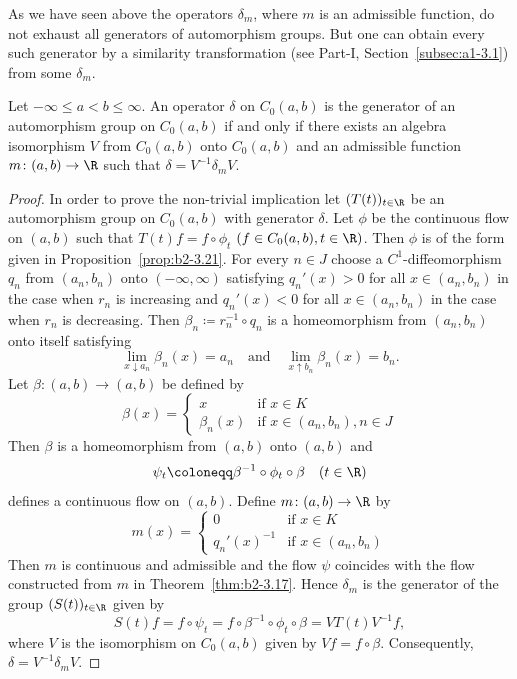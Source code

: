 As we have seen above the operators $\delta_{m}$, where $m$ is an admissible function, do not exhaust all generators of automorphism groups.
But one can obtain every such generator by a similarity transformation (see Part-I, Section~\ref{subsec:a1-3.1}) from some $\delta_{m}$.
\begin{theorem}\label{thm:b2-3.24}
%
Let $-\infty \leq a < b \leq \infty$.
An operator $\delta$ on $C_{0}(a,b)$ is the generator of an automorphism group on $C_{0}(a,b)$ if and only if there exists an algebra isomorphism $V$ from $C_{0}(a,b)$ onto $C_{0}(a,b)$ and an admissible function $m \colon (a,b) \to \R$ such that $\delta = V^{-1}\delta_{m}V$.
\end{theorem}
\begin{proof}
In order to prove the non-trivial implication let $(T(t))_{t \in \R}$ be an automorphism group on $C_{0}(a,b)$ with generator $\delta$.
Let $\phi$ be the continuous flow on $(a,b)$ such that $T(t)f = f \circ \phi_{t}$ $(f \in C_{0}(a,b), t \in \R)$.
Then $\phi$ is of the form given in Proposition~\ref{prop:b2-3.21}.
For every $n \in J$ choose a $C^{1}$-diffeomorphism $q_{n}$ from $(a_{n},b_{n})$ onto $(-\infty,\infty)$ satisfying $q_{n}'(x) > 0$ for all $x \in (a_{n},b_{n})$ in the case when $r_{n}$ is increasing and $q_{n}'(x) < 0$ for all $x \in (a_{n},b_{n})$ in the case when $r_{n}$ is decreasing.
Then $\beta_{n} \coloneqq r_{n}^{-1} \circ q_{n}$ is a homeomorphism from $(a_{n},b_{n})$ onto itself satisfying 
%
\[
	\lim_{x \downarrow a_{n}}\beta_{n}(x) = a_{n} \quad \text{and} \quad 
	\lim_{x \uparrow b_{n}}\beta_{n}(x) = b_{n} . 
\]
%
Let $\beta \colon (a,b) \to (a,b)$ be defined by
\begin{equation*}\label{eq:b2-beta}
\beta(x) = \begin{cases}
    x & \text{if } x \in K \\
    \beta_{n}(x) & \text{if } x \in (a_{n},b_{n}), n \in J
\end{cases}
\end{equation*}
Then $\beta$ is a homeomorphism from $(a,b)$ onto $(a,b)$ and 
\[
	\psi_{t} \coloneqq \beta^{-1} \circ \phi_{t} \circ \beta \quad (t \in \R)
\]
%
defines a continuous flow on $(a,b)$.
Define $m \colon (a,b) \to \R$ by
\begin{equation*}\label{eq:b2-m-def2}
m(x) = \begin{cases}
    0 & \text{if } x \in K \\
    q_{n}'(x)^{-1} & \text{if } x \in (a_{n},b_{n})
\end{cases}
\end{equation*}
Then $m$ is continuous and admissible and the flow $\psi$ coincides with the flow constructed from $m$ in Theorem~\ref{thm:b2-3.17}.
Hence $\delta_{m}$ is the generator of the group $(S(t))_{t \in \R}$ given by 
%
\[
	S(t)f = f \circ \psi_{t} = f \circ \beta^{-1} \circ \phi_{t} \circ \beta = VT(t)V^{-1}f ,
\]
%
where $V$ is the isomorphism on $C_{0}(a,b)$ given by $Vf = f \circ \beta$.
Consequently, $\delta = V^{-1}\delta_{m}V$.
\end{proof}
